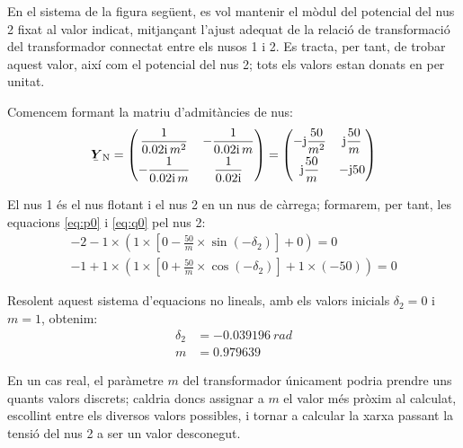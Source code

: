	
\begin{exemple}\label{ex:ControlTensTrafo}
	\addcontentsxms{\ControlTensTrafo}
    En el sistema de la figura següent, es vol mantenir el mòdul del
    potencial del nus 2 fixat al valor indicat, mitjançant l'ajust
    adequat de la relació de transformació del transformador connectat
    entre els nusos 1 i 2. Es tracta, per tant, de trobar aquest valor,
    així com el potencial del nus 2; tots els valors estan donats en     per unitat.

    \begin{center}
        
    \end{center}

    Comencem formant la matriu d'admitàncies de nus:
    \[
    \mcmplx{Y}\ped{N} = \begin{pmatrix}
    \dfrac{1}{\complexnum{j0,02} \,m^2}  &  -\dfrac{1}{\complexnum{j0,02} \,m} \\[1.5ex]
    -\dfrac{1}{\complexnum{j0,02}\, m}   & \dfrac{1}{\complexnum{j0,02}}
    \end{pmatrix} =
    \begin{pmatrix}
    -\ju\dfrac{50}{m^2}  &  \ju\dfrac{50}{m} \\[1.5ex]
    \ju\dfrac{50}{m}     & -\ju 50
    \end{pmatrix}
    \]

    El nus 1 és el nus flotant i el nus 2 en un nus de càrrega;
    formarem, per tant,  les equacions \eqref{eq:p0} i \eqref{eq:q0} pel
    nus 2:
    \begin{align*}
    -2 - 1 \times\left( 1 \times\left[ 0 -\frac{50}{m} \times\sin(-\delta_2) \right]  + 0 \right)  = 0   \\[1.5ex]
    -1 + 1 \times\left( 1 \times\left[0 + \frac{50}{m}
    \times\cos(-\delta_2) \right]  + 1\times (-50) \right)  = 0
    \end{align*}

    Resolent aquest sistema d'equacions no lineals, amb els valors
    inicials $\delta_2=0$ i $m=1$, obtenim:
    \begin{align*}
       \delta_2 &= \qty{-0,039196}{rad} \\[1ex]
       m & =\num{0,979639}
    \end{align*}

    En un cas real, el paràmetre $m$ del transformador únicament podria
    prendre uns quants valors discrets; caldria doncs assignar a $m$ el
    valor més pròxim al calculat, escollint entre els diversos valors
    possibles, i tornar a calcular la xarxa passant la tensió del nus
    2 a ser un valor desconegut.
\end{exemple}

